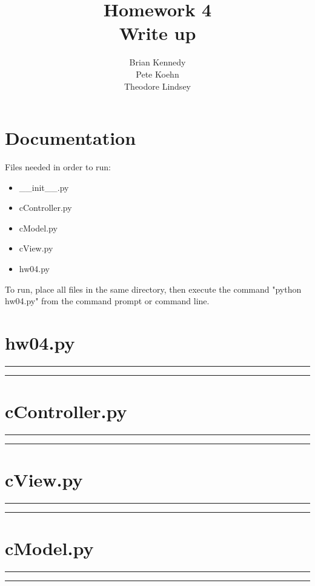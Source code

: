 \documentclass[12pt]{book}
\author{Brian Kennedy \\ Pete Koehn \\ Theodore Lindsey}
\title{Homework 4 \\ Write up}
\begin{document}
\maketitle
\newpage

\tableofcontents
\newpage


\section{Documentation}
Files needed in order to run:
\begin{itemize}
\item \_\_init\_\_.py
\item cController.py
\item cModel.py
\item cView.py
\item hw04.py
\end{itemize}

To run, place all files in the same directory, then execute the command "python hw04.py" from the command prompt or command line.

\section{hw04.py}
\hrule
\lstset{language=Python}

\hrule
\vspace{1cm}

\section{cController.py}
\hrule
\lstset{language=Python}

\hrule
\vspace{1cm}

\section{cView.py}
\hrule
\lstset{language=Python}

\hrule
\vspace{1cm}

\section{cModel.py}
\hrule
\lstset{language=Python}

\hrule
\vspace{1cm}
\end{document}
